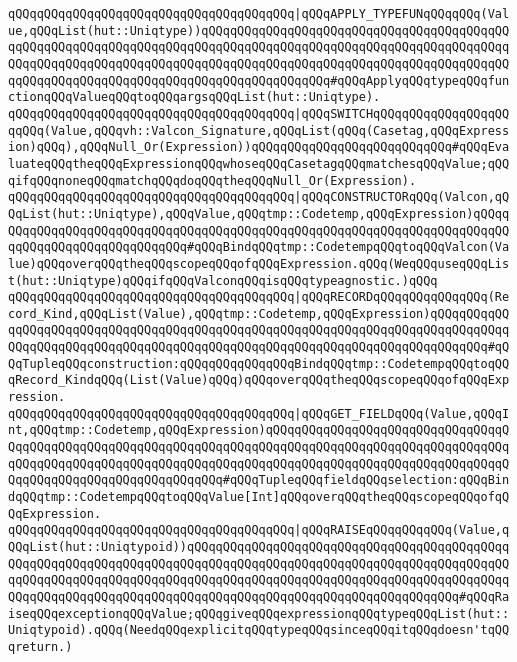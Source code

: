 \verb|qQQqqQQqqQQqqQQqqQQqqQQqqQQqqQQqqQQqqQQq|\verb#|qQQqAPPLY_TYPEFUNqQQqqQQq(Value,qQQqList(hut::Uniqtype))qQQqqQQqqQQqqQQqqQQqqQQqqQQqqQQqqQQqqQQqqQQqqQQqqQQqqQQqqQQqqQQqqQQqqQQqqQQqqQQqqQQqqQQqqQQqqQQqqQQqqQQqqQQqqQQqqQQqqQQqqQQqqQQqqQQqqQQqqQQqqQQqqQQqqQQqqQQqqQQqqQQqqQQqqQQqqQQqqQQqqQQqqQQqqQQqqQQqqQQqqQQqqQQqqQQqqQQqqQQqqQQqqQQq#\verb|#qQQqApplyqQQqtypeqQQqfunctionqQQqValueqQQqtoqQQqargsqQQqList(hut::Uniqtype).|\newline
\newline
\verb|qQQqqQQqqQQqqQQqqQQqqQQqqQQqqQQqqQQqqQQq|\verb#|qQQqSWITCHqQQqqQQqqQQqqQQqqQQqqQQq(Value,qQQqvh::Valcon_Signature,qQQqList(qQQq(Casetag,qQQqExpression)qQQq),qQQqNull_Or(Expression))qQQqqQQqqQQqqQQqqQQqqQQqqQQq#\verb|#qQQqEvaluateqQQqtheqQQqExpressionqQQqwhoseqQQqCasetagqQQqmatchesqQQqValue;qQQqifqQQqnoneqQQqmatchqQQqdoqQQqtheqQQqNull_Or(Expression).|\newline
\verb|qQQqqQQqqQQqqQQqqQQqqQQqqQQqqQQqqQQqqQQq|\verb#|qQQqCONSTRUCTORqQQq(Valcon,qQQqList(hut::Uniqtype),qQQqValue,qQQqtmp::Codetemp,qQQqExpression)qQQqqQQqqQQqqQQqqQQqqQQqqQQqqQQqqQQqqQQqqQQqqQQqqQQqqQQqqQQqqQQqqQQqqQQqqQQqqQQqqQQqqQQqqQQqqQQqqQQq#\verb|#qQQqBindqQQqtmp::CodetempqQQqtoqQQqValcon(Value)qQQqoverqQQqtheqQQqscopeqQQqofqQQqExpression.qQQq(WeqQQquseqQQqList(hut::Uniqtype)qQQqifqQQqValconqQQqisqQQqtypeagnostic.)qQQq|\newline
\newline
\verb|qQQqqQQqqQQqqQQqqQQqqQQqqQQqqQQqqQQqqQQq|\verb#|qQQqRECORDqQQqqQQqqQQqqQQq(Record_Kind,qQQqList(Value),qQQqtmp::Codetemp,qQQqExpression)qQQqqQQqqQQqqQQqqQQqqQQqqQQqqQQqqQQqqQQqqQQqqQQqqQQqqQQqqQQqqQQqqQQqqQQqqQQqqQQqqQQqqQQqqQQqqQQqqQQqqQQqqQQqqQQqqQQqqQQqqQQqqQQqqQQqqQQqqQQqqQQqqQQq#\verb|#qQQqTupleqQQqconstruction:qQQqqQQqqQQqqQQqBindqQQqtmp::CodetempqQQqtoqQQqRecord_KindqQQq(List(Value)qQQq)qQQqoverqQQqtheqQQqscopeqQQqofqQQqExpression.|\newline
\verb|qQQqqQQqqQQqqQQqqQQqqQQqqQQqqQQqqQQqqQQq|\verb#|qQQqGET_FIELDqQQq(Value,qQQqInt,qQQqtmp::Codetemp,qQQqExpression)qQQqqQQqqQQqqQQqqQQqqQQqqQQqqQQqqQQqqQQqqQQqqQQqqQQqqQQqqQQqqQQqqQQqqQQqqQQqqQQqqQQqqQQqqQQqqQQqqQQqqQQqqQQqqQQqqQQqqQQqqQQqqQQqqQQqqQQqqQQqqQQqqQQqqQQqqQQqqQQqqQQqqQQqqQQqqQQqqQQqqQQqqQQqqQQqqQQqqQQqqQQq#\verb|#qQQqTupleqQQqfieldqQQqselection:qQQqBindqQQqtmp::CodetempqQQqtoqQQqValue[Int]qQQqoverqQQqtheqQQqscopeqQQqofqQQqExpression.|\newline
\newline
\verb|qQQqqQQqqQQqqQQqqQQqqQQqqQQqqQQqqQQqqQQq|\verb#|qQQqRAISEqQQqqQQqqQQq(Value,qQQqList(hut::Uniqtypoid))qQQqqQQqqQQqqQQqqQQqqQQqqQQqqQQqqQQqqQQqqQQqqQQqqQQqqQQqqQQqqQQqqQQqqQQqqQQqqQQqqQQqqQQqqQQqqQQqqQQqqQQqqQQqqQQqqQQqqQQqqQQqqQQqqQQqqQQqqQQqqQQqqQQqqQQqqQQqqQQqqQQqqQQqqQQqqQQqqQQqqQQqqQQqqQQqqQQqqQQqqQQqqQQqqQQqqQQqqQQqqQQqqQQqqQQqqQQqqQQqqQQqqQQq#\verb|#qQQqRaiseqQQqexceptionqQQqValue;qQQqgiveqQQqexpressionqQQqtypeqQQqList(hut::Uniqtypoid).qQQq(NeedqQQqexplicitqQQqtypeqQQqsinceqQQqitqQQqdoesn'tqQQqreturn.)|\newline
